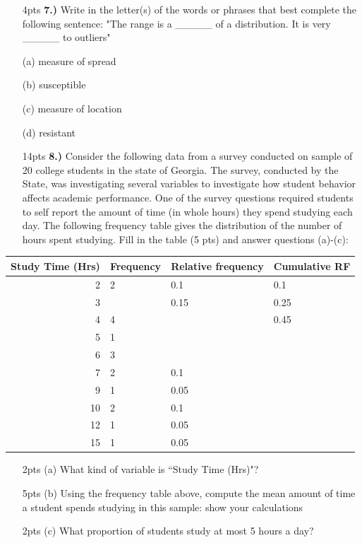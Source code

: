 \documentclass[
]{article}
\begin{document}
\begin{enumerate} 
  \item[4pts \bf 7.)]{Write in the letter(s) of the words or phrases that best complete the following sentence: "The range is a \_\_\_\_\_ of a distribution. It is very \_\_\_\_\_ to outliers"}
  \item[(a)] measure of spread
  \item[(b)] susceptible
  \item[(c)] measure of location
  \item[(d)] resistant
\end{enumerate}

\newpage
\begin{enumerate}
\item[14pts \bf 8.)] Consider the following data from a survey conducted on sample of 20 college students in the state of Georgia. The survey, conducted by the State, was investigating several variables to investigate how student behavior affects academic performance. One of the survey questions required students to self report the amount of time (in whole hours) they spend studying each day. The following frequency table gives the distribution of the number of hours spent studying. Fill in the table (5 pts) and answer questions (a)-(c):
\end{enumerate}

\begin{tabular}{r|l|l|l}
\hline
Study Time (Hrs) & Frequency & Relative frequency & Cumulative RF\\
\hline
2 & 2 & 0.1 & 0.1\\
\hline
3 &  & 0.15 & 0.25\\
\hline
4 & 4 &  & 0.45\\
\hline
5 & 1 &  & \\
\hline
6 & 3 &  & \\
\hline
7 & 2 & 0.1 & \\
\hline
9 & 1 & 0.05 & \\
\hline
10 & 2 & 0.1 & \\
\hline
12 & 1 & 0.05 & \\
\hline
15 & 1 & 0.05 & \\
\hline
\end{tabular}

\begin{itemize}
\item[2pts (a)]{What kind of variable is ``Study Time (Hrs)"?}
\item[]
\item[]
\item[5pts (b)]{Using the frequency table above, compute the mean amount of time a student spends studying in this sample: show your calculations}
\item[]
\item[]
\item[]
\item[]
\item[]
\item[]
\item[]
\item[]
\item[2pts (c)]{What proportion of students study at most 5 hours a day?}
\end{itemize}
\end{document}
